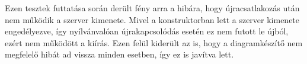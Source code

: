 Ezen tesztek futtatása során derült fény arra a hibára, hogy újracsatlakozás után nem működik a szerver kimenete. Mivel a konstruktorban lett a szerver kimenete engedélyezve, így nyílvánvalóan újrakapcsolódás esetén ez nem futott le újból, ezért nem működött a kiírás. Ezen felül kiderült az is, hogy a diagramkészítő nem megfelelő hibát ad vissza minden esetben, így ez is javítva lett.